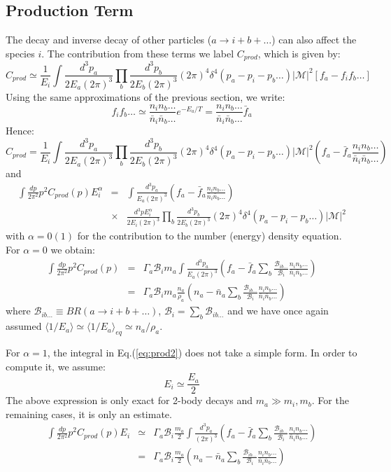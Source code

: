 \documentclass[preprint,notoc]{JHEP3}
\def\to{\rightarrow}
\def\be{\begin{equation}}
\def\ee{\end{equation}}
\def\bea{\begin{eqnarray}}
\def\eea{\end{eqnarray}}
\def\to{\rightarrow}
\begin{document}
\subsection{Production Term}

The decay and inverse decay of other particles ($a \to i + b + \ldots$) can also
affect the species $i$. The contribution from these terms we label $C_{prod}$, which is given
by\cite{kawasaki0}:
\be
C_{prod} \simeq \frac{1}{E_i} \int \frac{d^3 p_a}{2 E_a (2
\pi)^3} \prod_{b} \frac{d^3 p_b}{2 E_b (2 \pi)^3} (2 \pi)^4 \delta^{4}\left(p_a
- p_i - p_b \ldots\right) |\mathcal{M}|^2 \left[f_a - f_i f_b \ldots \right]
\ee
Using the same approximations of the previous section, we write:
\be
f_i f_b\ldots \simeq  \frac{n_i n_b \ldots}{\bar{n}_i \bar{n}_b \ldots}
e^{-E_a/T} = \frac{n_i n_b \ldots}{\bar{n}_i \bar{n}_b \ldots}
\bar{f}_{a}
\ee 
Hence:
\be
C_{prod} = \frac{1}{E_i} \int \frac{d^3 p_a}{2 E_a (2 \pi)^3} \prod_{b} \frac{d^3 p_b}{2 E_b (2 \pi)^3} 
(2 \pi)^4 \delta^{4}\left(p_a - p_i - p_b \ldots\right) |\mathcal{M}|^2
\left(f_a - \bar{f}_a \frac{n_i n_b \ldots}{\bar{n}_i
\bar{n}_b \ldots} \right)
\ee
and
\bea
\int \frac{dp}{2 \pi^2} p^2 C_{prod}(p) E_i^\alpha & = & 
\int \frac{d^3 p_a}{E_a (2 \pi)^3} \left(f_a - \bar{f}_a \frac{n_i n_b \ldots}{\bar{n}_i
\bar{n}_b \ldots} \right) \nonumber \\
& \times & \frac{d^3 p E_i^{\alpha}}{2 E_i (2 \pi)^3}
\prod_{b} \frac{d^3 p_b}{2 E_b (2 \pi)^3} (2 \pi)^4 \delta^{4}\left(p_a - p_i - p_b \ldots\right) |\mathcal{M}|^2
\label{eq:prod2}
\eea
with $\alpha = 0 (1)$ for the contribution to the number (energy) density equation.
For $\alpha = 0$ we obtain:
\bea
\int \frac{dp}{2 \pi^2} p^2 C_{prod}(p) & = & \Gamma_a  \mathcal{B}_{i} m_a 
\int \frac{d^3 p_a}{E_a (2 \pi)^3} \left(f_a - \bar{f}_a \sum_b
\frac{\mathcal{B}_{ib\ldots}}{\mathcal{B}_{i}}\frac{n_i n_b \ldots}{\bar{n}_i
\bar{n}_b \ldots} \right)
\nonumber
\\
& = & \Gamma_a \mathcal{B}_{i} m_a \frac{n_a}{\rho_a} \left( n_a - \bar{n}_a
  \sum_b \frac{\mathcal{B}_{ib\ldots}}{\mathcal{B}_{i}} \frac{n_i n_b
  \ldots}{\bar{n}_i \bar{n}_b \ldots} \right)
\eea
where $\mathcal{B}_{ib\ldots} \equiv BR(a \to i + b + \ldots)$, $\mathcal{B}_i
= \sum_{b} \mathcal{B}_{ib\ldots}$ and we have once again assumed $\langle 1/E_a
\rangle \simeq \langle 1/E_a \rangle_{eq} \simeq n_a/\rho_a$.


For $\alpha = 1$, the integral in Eq.(\ref{eq:prod2}) does not take a simple
form. In order to compute it, we assume:
\be
E_i \simeq \frac{E_a}{2}
\ee
The above expression is only exact for 2-body decays and $m_a \gg
m_i,m_b$. For the remaining cases, it is only an estimate.
\bea
\int \frac{dp}{2 \pi^2} p^2 C_{prod}(p) E_i & \simeq & 
\Gamma_a \mathcal{B}_{i}  \frac{m_a}{2} \int \frac{d^3 p_a}{(2
\pi)^3} \left(f_a - \bar{f}_a \sum_b
\frac{\mathcal{B}_{ib\ldots}}{\mathcal{B}_{i}}
 \frac{n_i n_b \ldots}{\bar{n}_i \bar{n}_b \ldots} \right)
\nonumber
\\
& = & \Gamma_a \mathcal{B}_{i}  \frac{m_a}{2} \left( n_a -
\bar{n}_a \sum_b \frac{\mathcal{B}_{ib\ldots}}{\mathcal{B}_{i}} \frac{n_i n_b
\ldots}{\bar{n}_i \bar{n}_b \ldots} \right)
\eea
\end{document}
